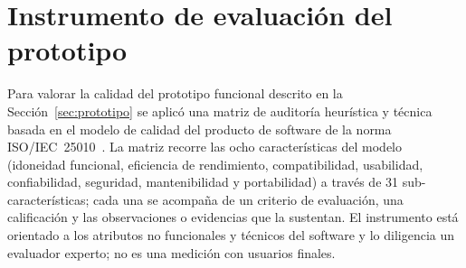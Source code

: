\documentclass[conference]{IEEEtran}
\begin{document}
%

\section{Instrumento de evaluación del prototipo}
\label{sec:instrumento}

Para valorar la calidad del prototipo funcional descrito en la
Sección~\ref{sec:prototipo} se aplicó una matriz de auditoría
heurística y técnica basada en el modelo de calidad del producto de
software de la norma ISO/IEC~25010~\cite{iso25010}. La matriz recorre las ocho
características del modelo (idoneidad funcional, eficiencia de
rendimiento, compatibilidad, usabilidad, confiabilidad, seguridad,
mantenibilidad y portabilidad) a través de 31 sub-características; cada
una se acompaña de un criterio de evaluación, una calificación y las
observaciones o evidencias que la sustentan. El instrumento está
orientado a los atributos no funcionales y técnicos del software y lo
diligencia un evaluador experto; no es una medición con usuarios finales.
\end{document}
